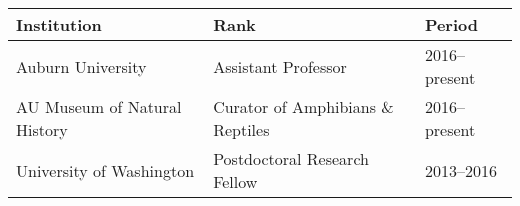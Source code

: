 \noindent\begin{tabulary}{\textwidth}{ @{} l l l @{} }
    \textbf{Institution} & \textbf{Rank} & \textbf{Period} \\
    \hline
    Auburn University & Assistant Professor & 2016--present \\
    AU Museum of Natural History & Curator of Amphibians \& Reptiles & 2016--present \\
    University of Washington & Postdoctoral Research Fellow & 2013--2016 \\
\end{tabulary}

